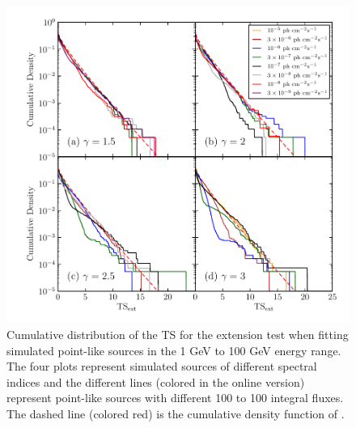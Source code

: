 \begin{figure}[htbp]
    \includegraphics{chapters/extended_analysis/figures/mc_plots/ts_ext_emin_1000_color.pdf}
    \caption{Cumulative distribution of the TS for the extension test
    when fitting simulated point-like sources in the 1 GeV to 100
    GeV energy range.  The four plots represent simulated sources of
    different spectral indices and the different lines (colored in the
    online version) represent point-like sources with different 100
    \mev to 100 \gev integral fluxes.  The dashed line (colored red)
    is the cumulative density function of .}
  \end{figure}

